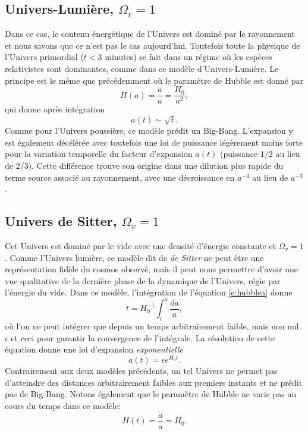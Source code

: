 \subsection{Univers-Lumière, $\Omega_r=1$ }
Dans ce cas, le contenu énergétique de l'Univers est dominé par le rayonnement et nous savons que ce n'est pas le cas aujourd'hui. Toutefois toute la physique de l'Univers primordial ($t<3$ minutes) se fait dans un régime où les espèces relativistes sont dominantes, comme dans ce modèle d'Univers-Lumière. Le principe est le même que précédemment où le paramètre de Hubble est donné par 
\begin{equation}
H(a)=\frac{\dot a}{a}=\frac{H_0}{a^2},
\end{equation} 
qui donne après intégration
\begin{equation}
a(t)\sim\sqrt{t}.
\end{equation}
Comme pour l'Univers poussière, ce modèle prédit un Big-Bang. L'expansion y est également décélérée avec toutefois une loi de puissance légèrement moins forte pour la variation temporelle du facteur d'expansion $a(t)$ (puissance $1/2$ au lieu de $2/3$). Cette différence trouve son origine dans une dilution plus rapide du terme source associé au rayonnement, avec une décroissance en $a^{-4}$ au lieu de $a^{-3}$.

\subsection{Univers de Sitter, $\Omega_v=1$}
Cet Univers est dominé par le vide avec une densité d'énergie constante et $\Omega_v=1$. Comme l'Univers lumière, ce modèle dit de \textit{de Sitter} ne peut être une représentation fidèle du cosmos observé, mais il peut nous permettre d'avoir une vue qualitative de la dernière phase de la dynamique de l'Univers, régie par l'énergie du vide. Dans ce modèle, l'intégration de l'équation \ref{e:hubblea} donne 
\begin{equation}
t=H_0^{-1}\int_\epsilon^a\frac{da}{a},
\end{equation}
où l'on ne peut intégrer que depuis un temps arbitrairement faible, mais non nul $\epsilon$ et ceci pour garantir la convergence de l'intégrale. La résolution de cette équation donne une loi d'expansion \textit{exponentielle}
\begin{equation}
a(t)=\epsilon e^{H_0 t}.
\end{equation}
Contrairement aux deux modèles précédents, un tel Univers ne permet pas d'atteindre des distances arbitrairement faibles aux premiers instants et ne prédit pas de Big-Bang. Notons également que le paramètre de Hubble ne varie pas au cours du temps dans ce modèle:
\begin{equation}
H(t)=\frac{\dot a}{a}=H_0.
\end{equation}

